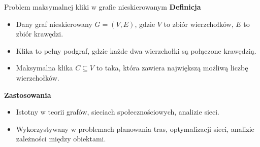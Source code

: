 \begin{frame}{Problem maksymalnej kliki w grafie nieskierowanym}
\textbf{Definicja}
\begin{itemize}
	\item Dany graf nieskierowany $G = (V, E)$, gdzie $V$ to zbiór wierzchołków, $E$ to zbiór krawędzi.
	\item Klika to pełny podgraf, gdzie każde dwa wierzchołki są połączone krawędzią.
	\item Maksymalna klika $C \subseteq V$  to taka, która zawiera największą możliwą liczbę wierzchołków.
\end{itemize}
\vspace{10pt}

\textbf{Zastosowania}
\begin{itemize}
	\item Istotny w teorii grafów, sieciach społecznościowych, analizie sieci.
	\item Wykorzystywany w problemach planowania tras, optymalizacji sieci, analizie zależności między obiektami.
\end{itemize}
\end{frame}
	